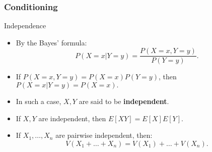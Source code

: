 \begin{frame}
    \frametitle{Conditioning}
\begin{block}{Independence}
    \begin{itemize}
        \item<+-> By the Bayes' formula:
        \begin{equation}
            P\left( X = x \vert Y = y \right) = \frac{P\left( X = x, Y = y \right)}{P(Y=y)}.
        \end{equation}
        \item<+-> If $P\left( X = x, Y = y \right) = P\left( X = x \right)P\left( Y = y \right)$, then
        $P\left( X = x \vert Y = y \right) = P\left( X = x \right).$
        \item<+-> In such a case, $X,Y$ are said to be \textbf{independent}.
        \item<+-> If $X,Y$ are independent, then $E\left[ XY \right] = E[X]E[Y].$
        \item<+-> If $X_1, \dots, X_n$ are pairwise independent, then:
        \begin{equation}
            V\left( X_1 + \dots + X_n \right) = V\left( X_1 \right) + \dots + V\left( X_n \right).
        \end{equation}
    \end{itemize}
\end{block}
\end{frame}
